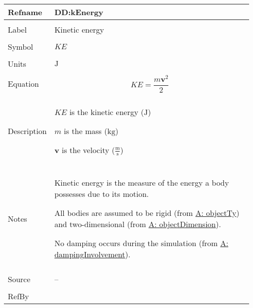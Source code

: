 \documentclass[12pt]{article}
\begin{document}
\vspace{\baselineskip}
\noindent
\begin{minipage}{\textwidth}
\begin{tabular}{>{\raggedright}p{}>{\raggedright\arraybackslash}p{}}
\toprule \textbf{Refname} & \textbf{DD:kEnergy}
\label{DD:kEnergy}
\\ \midrule \\
Label & Kinetic energy
        
\\ \midrule \\
Symbol & $KE$
         
\\ \midrule \\
Units & ${\text{J}}$
        
\\ \midrule \\
Equation & \begin{displaymath}
           KE=\frac{m \mathbf{v}^{2}}{2}
           \end{displaymath}
\\ \midrule \\
Description & \begin{symbDescription}
              \item{$KE$ is the kinetic energy (${\text{J}}$)}
              \item{$m$ is the mass (${\text{kg}}$)}
              \item{$\mathbf{v}$ is the velocity ($\frac{\text{m}}{\text{s}}$)}
              \end{symbDescription}
\\ \midrule \\
Notes & Kinetic energy is the measure of the energy a body possesses due to its motion.
        
        All bodies are assumed to be rigid (from \hyperref[assumpOT]{A: objectTy}) and two-dimensional (from \hyperref[assumpOD]{A: objectDimension}).
        
        No damping occurs during the simulation (from \hyperref[assumpDI]{A: dampingInvolvement}).
        
\\ \midrule \\
Source & --
         
\\ \midrule \\
RefBy & 
\\ \bottomrule
\end{tabular}
\end{minipage}
\end{document}
